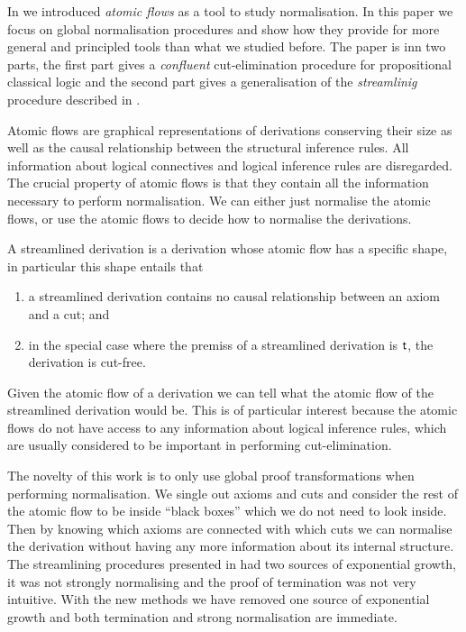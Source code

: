 \documentclass[a4paper]{amsart}
\theoremstyle{remark}
\theoremstyle{definition}
\begin{document}
In \cite{GuglGund:07:Normalis:lr} we introduced \emph{atomic flows} as a tool to study normalisation. In this paper we focus on global normalisation procedures and show how they provide for more general and principled tools than what we studied before. The paper is inn two parts, the first part gives a \emph{confluent} cut-elimination procedure for propositional classical logic and the second part gives a generalisation of the \emph{streamlinig} procedure described in \cite{GuglGund:07:Normalis:lr}.

Atomic flows are graphical representations of derivations conserving their size as well as the causal relationship between the structural inference rules. All information about logical connectives and logical inference rules are disregarded. The crucial property of atomic flows is that they contain all the information necessary to perform normalisation. We can either just normalise the atomic flows, or use the atomic flows to decide how to normalise the derivations.

A streamlined derivation is a derivation whose atomic flow has a speciﬁc shape, in particular this shape entails that

\begin{enumerate}
\item a streamlined derivation contains no causal relationship between an axiom and a cut; and
\item in the special case where the premiss of a streamlined derivation is $\mathsf t$, the derivation is cut-free.
\end{enumerate}

Given the atomic flow of a derivation we can tell what the atomic flow of the streamlined derivation would be. This is of particular interest because the atomic flows do not have access to any information about logical inference rules, which are usually considered to be important in performing cut-elimination.

The novelty of this work is to only use global proof transformations when performing normalisation. We single out axioms and cuts and consider the rest of the atomic flow to be inside ``black boxes'' which we do not need to look inside. Then by knowing which axioms are connected with which cuts we can normalise the derivation without having any more information about its internal structure. The streamlining procedures presented in \cite{GuglGund:07:Normalis:lr} had two sources of exponential growth, it was not strongly normalising and the proof of termination was not very intuitive. With the new methods we have removed one source of exponential growth and both termination and strong normalisation are immediate.
\end{document}

